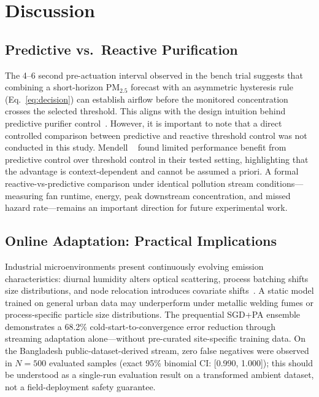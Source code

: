
\section{Discussion}
\label{sec:discussion}

\subsection{Predictive vs.\ Reactive Purification}
The 4--6 second pre-actuation interval observed in the bench trial suggests that
combining a short-horizon PM$_{2.5}$ forecast with an asymmetric hysteresis rule
(Eq.~\ref{eq:decision}) can establish airflow before the monitored concentration
crosses the selected threshold. This aligns with the design intuition behind predictive
purifier control~\citep{energyeff2024benv,beldar2025aipurifier}. However, it is important
to note that a direct controlled comparison between predictive and reactive threshold
control was not conducted in this study. Mendell \etal{}~\citep{mendell2025predictive}
found limited performance benefit from predictive control over threshold control in their
tested setting, highlighting that the advantage is context-dependent and cannot be assumed
a priori. A formal reactive-vs-predictive comparison under identical pollution stream
conditions---measuring fan runtime, energy, peak downstream concentration, and missed
hazard rate---remains an important direction for future experimental work.

\subsection{Online Adaptation: Practical Implications}
Industrial microenvironments present continuously evolving emission characteristics:
diurnal humidity alters optical scattering, process batching shifts size distributions,
and node relocation introduces covariate shifts~\citep{basak2025spatial}. A static model
trained on general urban data may underperform under metallic welding fumes or process-specific
particle size distributions. The prequential SGD+PA ensemble demonstrates a 68.2\%
cold-start-to-convergence error reduction through streaming adaptation alone---without
pre-curated site-specific training data. On the Bangladesh public-dataset-derived stream,
zero false negatives were observed in $N=500$ evaluated samples (exact 95\% binomial CI:
[0.990, 1.000]); this should be understood as a single-run evaluation result on a
transformed ambient dataset, not a field-deployment safety guarantee.

